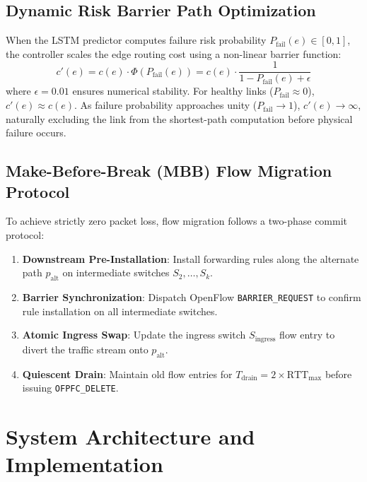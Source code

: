 \documentclass[11pt,a4paper]{report}
\begin{document}
\section{Dynamic Risk Barrier Path Optimization}
When the LSTM predictor computes failure risk probability $P_{\text{fail}}(e) \in [0, 1]$, the controller scales the edge routing cost using a non-linear barrier function:
\begin{equation}
c'(e) = c(e) \cdot \Phi(P_{\text{fail}}(e)) = c(e) \cdot \frac{1}{1 - P_{\text{fail}}(e) + \epsilon}
\end{equation}
where $\epsilon = 0.01$ ensures numerical stability. For healthy links ($P_{\text{fail}} \approx 0$), $c'(e) \approx c(e)$. As failure probability approaches unity ($P_{\text{fail}} \to 1$), $c'(e) \to \infty$, naturally excluding the link from the shortest-path computation before physical failure occurs.

\section{Make-Before-Break (MBB) Flow Migration Protocol}
To achieve strictly zero packet loss, flow migration follows a two-phase commit protocol:
\begin{enumerate}
    \item \textbf{Downstream Pre-Installation}: Install forwarding rules along the alternate path $p_{\text{alt}}$ on intermediate switches $S_2, \dots, S_k$.
    \item \textbf{Barrier Synchronization}: Dispatch OpenFlow \texttt{BARRIER\_REQUEST} to confirm rule installation on all intermediate switches.
    \item \textbf{Atomic Ingress Swap}: Update the ingress switch $S_{\text{ingress}}$ flow entry to divert the traffic stream onto $p_{\text{alt}}$.
    \item \textbf{Quiescent Drain}: Maintain old flow entries for $T_{\text{drain}} = 2 \times \text{RTT}_{\max}$ before issuing \texttt{OFPFC\_DELETE}.
\end{enumerate}

\chapter{System Architecture and Implementation}
\end{document}
